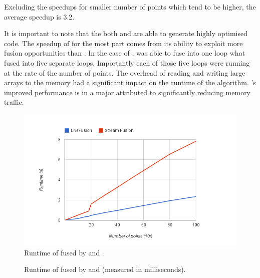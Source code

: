 \documentclass[preamble.tex]{subfiles}
\begin{document}
Excluding the speedups for smaller number of points which tend to be higher, the average speedup is 3.2.

It is important to note that the both \LiveFusion and \StreamFusion are able to generate highly optimised code. The speedup of \LiveFusion for the most part comes from its ability to exploit more fusion opportunities than \StreamFusion. In the case of \FilterMax, \LiveFusion was able to fuse into one loop what \StreamFusion fused into five separate loops. Importantly each of those five loops were running at the rate of the number of points. The overhead of reading and writing large arrays to the memory had a significant impact on the runtime of the algorithm. \LiveFusion's improved performance is in a major attributed to significantly reducing memory traffic.


\begin{figure}
\includegraphics[center]{img/Eval-FarAndAboves}
\caption{Runtime of \FilterMax fused by \StreamFusion and \LiveFusion.}
\label{fig:Eval-FarAndAboves}
\end{figure}

\begin{figure}
\caption{Runtime of \FilterMax fused by \StreamFusion and \LiveFusion (measured in milliseconds).}
\label{fig:Eval-FarAndAboves-numbers}
\end{figure}








\IfNotCompilingAll{}
\end{document}
